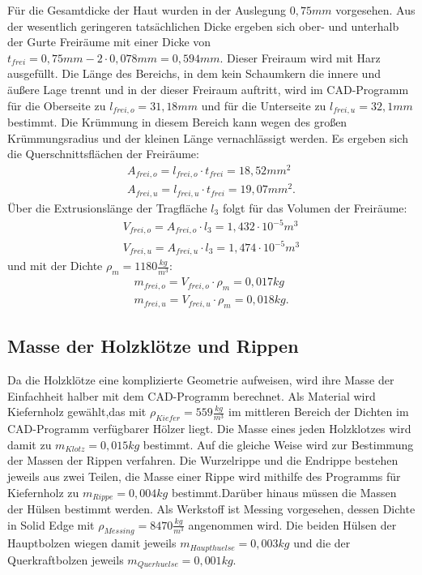 Für die Gesamtdicke der Haut wurden in der Auslegung $ 0,75mm $ vorgesehen. Aus der wesentlich geringeren tatsächlichen Dicke ergeben sich ober- und unterhalb der Gurte Freiräume mit einer Dicke von $t_{frei}= 0,75mm-2\cdot 0,078mm=0,594mm $. Dieser Freiraum wird mit Harz ausgefüllt. Die Länge des Bereichs, in dem kein Schaumkern die innere und äußere Lage trennt und in der dieser Freiraum auftritt, wird im CAD-Programm für die Oberseite zu $ l_{frei,o}= 31,18mm $ und für die Unterseite zu $ l_{frei,u}=32,1mm $ bestimmt. Die Krümmung in diesem Bereich kann wegen des großen Krümmungsradius und der kleinen Länge vernachlässigt werden. Es ergeben sich die Querschnittsflächen der Freiräume:
\begin{equation}
\begin{array}{l}
		A_{frei,o}=l_{frei,o}\cdot t_{frei}=18,52mm^{2} \\
		A_{frei,u}=l_{frei,u}\cdot t_{frei}=19,07mm^{2}.
\end{array}
\end{equation}
Über die Extrusionslänge der Tragfläche $ l_{3} $ folgt für das Volumen der Freiräume:
\begin{equation}
	\begin{array}{l}
		V_{frei,o}=A_{frei,o}\cdot l_{3}= 1,432\cdot 10^{-5}m^{3} \\
		V_{frei,u}=A_{frei,u}\cdot l_{3}= 1,474\cdot 10^{-5}m^{3} 
	\end{array}
\end{equation}
und mit der Dichte $ \rho_{m}=1180\frac{kg}{m^{3}} $:
\begin{equation}
	\begin{array}{l}
		m_{frei,o}=V_{frei,o}\cdot \rho_{m}=0,017kg\\
		m_{frei,u}=V_{frei,u}\cdot \rho_{m}=0,018kg.
	\end{array}
\end{equation}

\subsection{Masse der Holzklötze und Rippen}
Da die Holzklötze eine komplizierte Geometrie aufweisen, wird ihre Masse der Einfachheit halber mit dem CAD-Programm berechnet. Als Material wird Kiefernholz gewählt,das mit $ \rho_{Kiefer}=559\frac{kg}{m^{3}} $ im mittleren Bereich der Dichten im CAD-Programm verfügbarer Hölzer liegt. Die Masse eines jeden Holzklotzes wird damit zu $ m_{Klotz}=0,015kg $ bestimmt.
Auf die gleiche Weise wird zur Bestimmung der Massen der Rippen verfahren. Die Wurzelrippe und die Endrippe bestehen jeweils aus zwei Teilen, die Masse einer Rippe wird mithilfe des Programms für Kiefernholz zu $ m_{Rippe}=0,004kg $ bestimmt.Darüber hinaus müssen die Massen der Hülsen bestimmt werden. Als Werkstoff ist Messing vorgesehen, dessen Dichte in Solid Edge mit $ \rho_{Messing}=8470\frac{kg}{m^{3}} $ angenommen wird. Die beiden Hülsen der Hauptbolzen wiegen damit jeweils $ m_{Haupthuelse}=0,003kg $ und die der Querkraftbolzen jeweils $ m_{Querhuelse}=0,001kg $.

